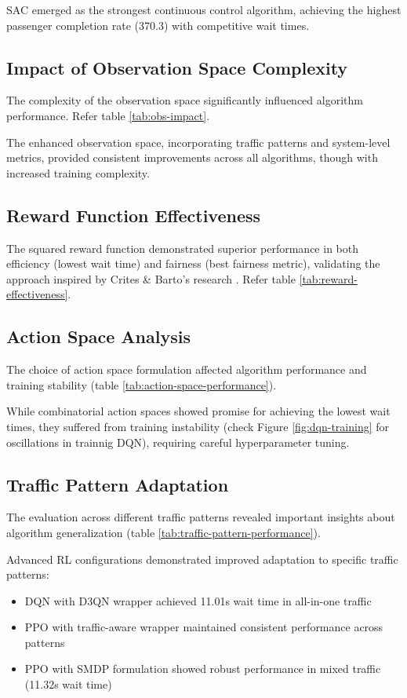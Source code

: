 \documentclass[10pt,twocolumn]{article}
\begin{document}
SAC emerged as the strongest continuous control algorithm, achieving the highest passenger completion rate (370.3) with competitive wait times.

\subsection{Impact of Observation Space Complexity}
The complexity of the observation space significantly influenced algorithm performance. Refer table \ref{tab:obs-impact}.

The enhanced observation space, incorporating traffic patterns and system-level metrics, provided consistent improvements across all algorithms, though with increased training complexity.

\subsection{Reward Function Effectiveness}
The squared reward function demonstrated superior performance in both efficiency (lowest wait time) and fairness (best fairness metric), validating the approach inspired by Crites \& Barto's research \cite{CRITES1995}. Refer table \ref{tab:reward-effectiveness}.

\subsection{Action Space Analysis}
The choice of action space formulation affected algorithm performance and training stability (table \ref{tab:action-space-performance}).

While combinatorial action spaces showed promise for achieving the lowest wait times, they suffered from training instability (check Figure \ref{fig:dqn-training} for oscillations in trainnig DQN), requiring careful hyperparameter tuning.

\subsection{Traffic Pattern Adaptation}
The evaluation across different traffic patterns revealed important insights about algorithm generalization (table \ref{tab:traffic-pattern-performance}).

Advanced RL configurations demonstrated improved adaptation to specific traffic patterns:
\begin{itemize}
    \item DQN with D3QN wrapper achieved 11.01s wait time in all-in-one traffic
    \item PPO with traffic-aware wrapper maintained consistent performance across patterns
    \item PPO with SMDP formulation showed robust performance in mixed traffic (11.32s wait time)
\end{itemize}
\end{document}

